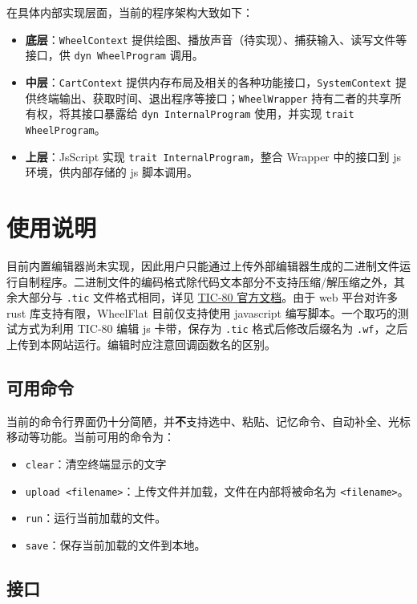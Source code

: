 \documentclass[UTF8]{ctexart}
\begin{document}
在具体内部实现层面，当前的程序架构大致如下：

\begin{itemize}
    \item \textbf{底层}：\texttt{WheelContext} 提供绘图、播放声音（待实现）、捕获输入、读写文件等接口，供 \texttt{dyn WheelProgram} 调用。
    \item \textbf{中层}：\texttt{CartContext} 提供内存布局及相关的各种功能接口，\texttt{SystemContext} 提供终端输出、获取时间、退出程序等接口；\texttt{WheelWrapper} 持有二者的共享所有权，将其接口暴露给 \texttt{dyn InternalProgram} 使用，并实现 \texttt{trait WheelProgram}。
    \item \textbf{上层}：JsScript 实现 \texttt{trait InternalProgram}，整合 Wrapper 中的接口到 js 环境，供内部存储的 js 脚本调用。
\end{itemize}

\section{使用说明}

目前内置编辑器尚未实现，因此用户只能通过上传外部编辑器生成的二进制文件运行自制程序。二进制文件的编码格式除代码文本部分不支持压缩/解压缩之外，其余大部分与 \texttt{.tic} 文件格式相同，详见 \href{https://github.com/nesbox/TIC-80/wiki/.tic-File-Format}{TIC-80 官方文档}。由于 web 平台对许多 rust 库支持有限，WheelFlat 目前仅支持使用 javascript 编写脚本。一个取巧的测试方式为利用 TIC-80 编辑 js 卡带，保存为 \texttt{.tic} 格式后修改后缀名为 \texttt{.wf}，之后上传到本网站运行。编辑时应注意回调函数名的区别。

\subsection{可用命令}

当前的命令行界面仍十分简陋，并\textbf{不}支持选中、粘贴、记忆命令、自动补全、光标移动等功能。当前可用的命令为：

\begin{itemize}
    \item \texttt{clear}：清空终端显示的文字
    \item \texttt{upload <filename>}：上传文件并加载，文件在内部将被命名为 \texttt{<filename>}。
    \item \texttt{run}：运行当前加载的文件。
    \item \texttt{save}：保存当前加载的文件到本地。
\end{itemize}

\subsection{接口}
\end{document}
